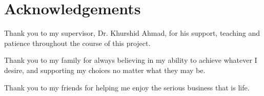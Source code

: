 
\chapter*{\Huge{Acknowledgements}}

Thank you to my supervisor, Dr. Khurshid Ahmad, for his support, teaching and patience throughout the course of this project.

Thank you to my family for always believing in my ability to achieve whatever I desire, and supporting my choices no matter what they may be.

Thank you to my friends for helping me enjoy the serious business that is life.